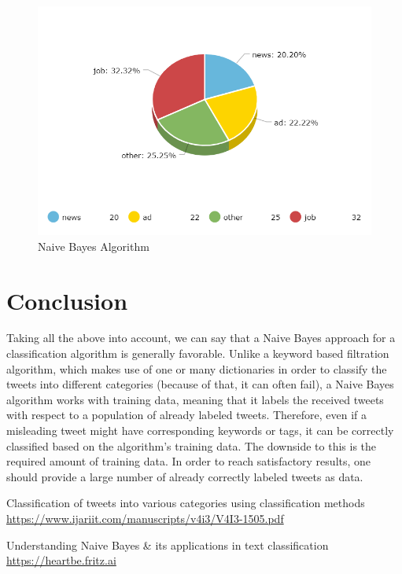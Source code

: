 \documentclass{article}
\begin{document}
\begin{figure}[H]
    \centering
    \includegraphics[width=\linewidth]{figures/NaiveBayes}
    \caption{Naive Bayes Algorithm}
\end{figure}

\vfill 
\clearpage
\newpage

\section{Conclusion}
\large
{
\quad
Taking all the above into account, we can say that a Naive Bayes approach for a classification algorithm is generally favorable. Unlike a keyword based filtration algorithm, which makes use of one or many dictionaries in order to classify the tweets into different categories (because of that, it can often fail), a Naive Bayes algorithm works with training data, meaning that it labels the received tweets with respect to a population of already labeled tweets. Therefore, even if a misleading tweet might have corresponding keywords or tags, it can be correctly classified based on the algorithm's training data. The downside to this is the required amount of training data. In order to reach satisfactory results, one should provide a large number of already correctly labeled tweets as data.
}

\begin{thebibliography}{1}

    Classification of tweets into various categories using classification methods
    \url{https://www.ijariit.com/manuscripts/v4i3/V4I3-1505.pdf}
    
    Understanding Naive Bayes \& its applications in text classification
    \url{https://heartbe.fritz.ai}
\end{thebibliography}
\end{document}
